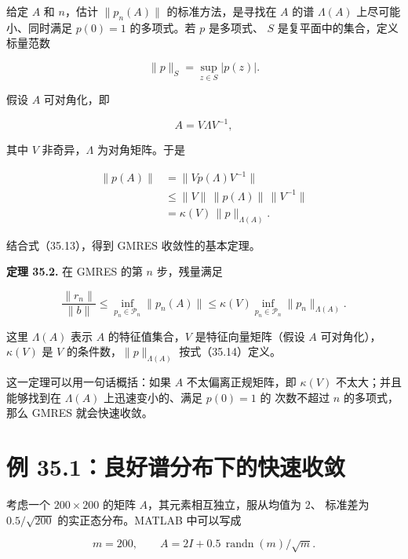 \documentclass[UTF8,fontset=none,12pt]{ctexart}
\begin{document}
给定 $A$ 和 $n$，估计 $\lVert p_n(A)\rVert$ 的标准方法，是寻找在 $A$ 的谱
$\Lambda(A)$ 上尽可能小、同时满足 $p(0)=1$ 的多项式。若 $p$ 是多项式、
$S$ 是复平面中的集合，定义标量范数

\begin{equation}
\lVert p\rVert_S=\sup_{z\in S}\lvert p(z)\rvert.
\tag{35.14}
\end{equation}

假设 $A$ 可对角化，即

\[
A=V\Lambda V^{-1},
\]

其中 $V$ 非奇异，$\Lambda$ 为对角矩阵。于是

\begin{equation}
\begin{aligned}
\lVert p(A)\rVert
&=\lVert Vp(\Lambda)V^{-1}\rVert\\
&\leq \lVert V\rVert\,\lVert p(\Lambda)\rVert\,\lVert V^{-1}\rVert\\
&=\kappa(V)\,\lVert p\rVert_{\Lambda(A)}.
\end{aligned}
\tag{35.15}
\end{equation}

结合式（35.13），得到 GMRES 收敛性的基本定理。

\textbf{定理 35.2.}
在 GMRES 的第 $n$ 步，残量满足

\begin{equation}
\frac{\lVert r_n\rVert}{\lVert b\rVert}
\leq
\inf_{p_n\in\mathcal P_n}\lVert p_n(A)\rVert
\leq
\kappa(V)\inf_{p_n\in\mathcal P_n}
\lVert p_n\rVert_{\Lambda(A)}.
\tag{35.16}
\end{equation}

这里 $\Lambda(A)$ 表示 $A$ 的特征值集合，$V$ 是特征向量矩阵（假设 $A$
可对角化），$\kappa(V)$ 是 $V$ 的条件数，$\lVert p\rVert_{\Lambda(A)}$
按式（35.14）定义。

这一定理可以用一句话概括：如果 $A$ 不太偏离正规矩阵，即 $\kappa(V)$
不太大；并且能够找到在 $\Lambda(A)$ 上迅速变小的、满足 $p(0)=1$ 的
次数不超过 $n$ 的多项式，那么 GMRES 就会快速收敛。

\section*{例 35.1：良好谱分布下的快速收敛}

考虑一个 $200\times200$ 的矩阵 $A$，其元素相互独立，服从均值为 $2$、
标准差为 $0.5/\sqrt{200}$ 的实正态分布。MATLAB 中可以写成

\begin{equation}
m=200,\qquad
A=2I+0.5\,\operatorname{randn}(m)/\sqrt m.
\tag{35.17}
\end{equation}
\end{document}
